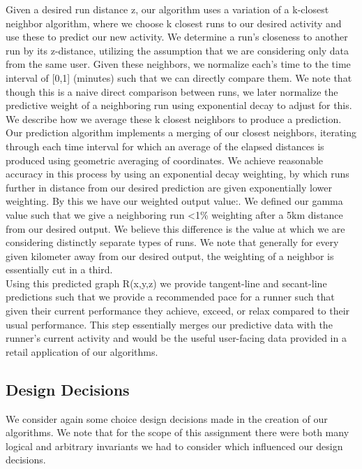 \documentclass[twoside]{article}
\begin{document}
\begin{multicols}{2}
	Given a desired run distance z, our algorithm uses a variation of a k-closest neighbor algorithm, where we choose k closest runs to our desired activity and use these to predict our new activity.  We determine a run's closeness to another run by its z-distance, utilizing the assumption that we are considering only data from the same user.  Given these neighbors, we normalize each's time to the time interval of [0,1] (minutes) such that we can directly compare them. We note that though this is a naive direct comparison between runs, we later normalize the predictive weight of a neighboring run using exponential decay to adjust for this.  We describe how we average these k closest neighbors to produce a prediction.\\
	
	Our prediction algorithm implements a merging of our closest neighbors, iterating through each time interval for which an average of the elapsed distances is produced using geometric averaging of coordinates.  We achieve reasonable accuracy in this process by using an exponential decay weighting, by which runs further in distance from our desired prediction are given exponentially lower weighting.  By this we have our weighted output value:. We defined our gamma value such that we give a neighboring run <1\% weighting after a 5km distance from our desired output.  We believe this difference is the value at which we are considering distinctly separate types of runs.  We note that generally for every given kilometer away from our desired output, the weighting of a neighbor is essentially cut in a third.\\
	
	Using this predicted graph R(x,y,z) we provide tangent-line and secant-line predictions such that we provide a recommended pace for a runner such that given their current performance they achieve, exceed, or relax compared to their usual performance.  This step essentially merges our predictive data with the runner's current activity and would be the useful user-facing data provided in a retail application of our algorithms.\\

\subsection{Design Decisions}
	We consider again some choice design decisions made in the creation of our algorithms.  We note that for the scope of this assignment there were both many logical and arbitrary invariants we had to consider which influenced our design decisions.\\
	

\end{multicols}
\end{document}
